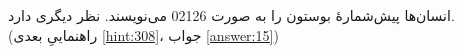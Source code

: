 \section{}
\paragraph{}\label{hint:99}
انسان‌ها پیش‌شمارهٔ بوستون را به صورت 02126 می‌نویسند.  نظر دیگری دارد. (راهنماییِ بعدی \ref{hint:308}، جواب \ref{answer:15})